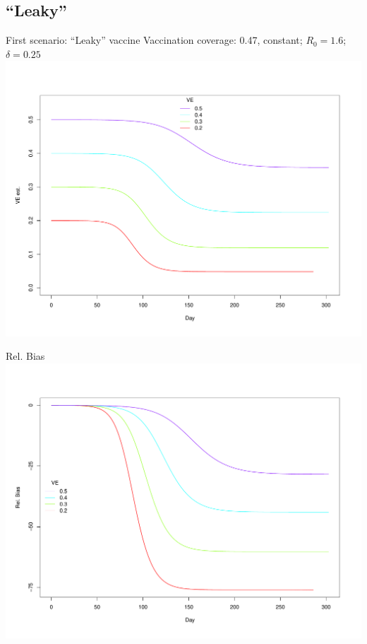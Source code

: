 \documentclass{beamer}
\begin{document}
\subsection{``Leaky''}
\begin{frame}{First scenario: ``Leaky'' vaccine}
Vaccination coverage: 0.47, constant; $R_0=1.6$; $\delta = 0.25$
\centering
\includegraphics[width=.8\textwidth]{VEtime.pdf}
\end{frame}
%
%
\begin{frame}{Rel. Bias}
\includegraphics[width=.9\textwidth]{VEbias_rel.pdf}
\end{frame}
%
%
\end{document}
